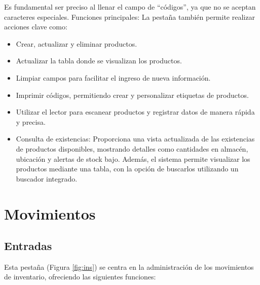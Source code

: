 Es fundamental ser preciso al llenar el campo de “códigos”, ya que no se aceptan caracteres especiales. Funciones principales: La pestaña también permite realizar acciones clave como: 

\begin{itemize}
    \item Crear, actualizar y eliminar productos. 

    \item Actualizar la tabla donde se visualizan los productos. 

    \item Limpiar campos para facilitar el ingreso de nueva información. 

    \item Imprimir códigos, permitiendo crear y personalizar etiquetas de productos. 

    \item Utilizar el lector para escanear productos y registrar datos de manera rápida y precisa. 

    \item Consulta de existencias: Proporciona una vista actualizada de las existencias de productos disponibles, mostrando detalles como cantidades en almacén, ubicación y alertas de stock bajo. Además, el sistema permite visualizar los productos mediante una tabla, con la opción de buscarlos utilizando un buscador integrado. 
\end{itemize}

\section{Movimientos}

\subsection{Entradas}
Esta pestaña (Figura \ref{fig:ins}) se centra en la administración de los movimientos de inventario, ofreciendo las siguientes funciones: 

